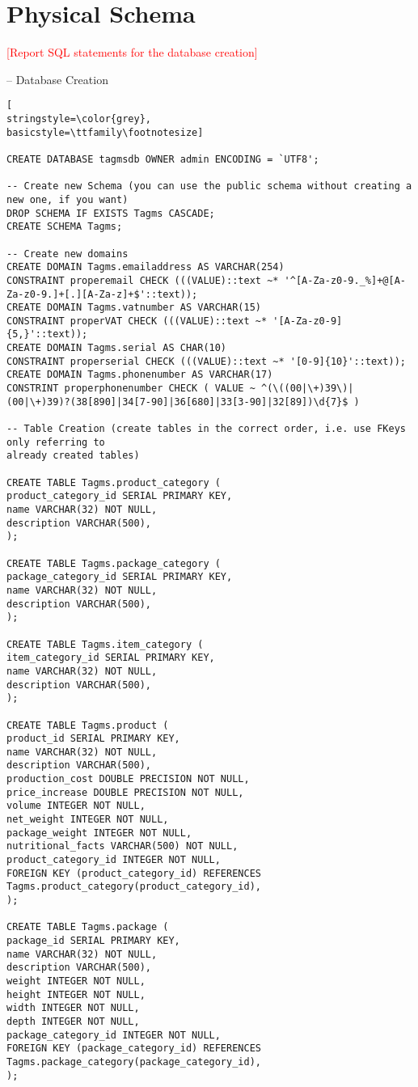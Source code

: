 \section{Physical Schema}
\textcolor{red}{[Report SQL statements for the database creation]}

-- Database Creation
\begin{lstlisting}[
stringstyle=\color{grey},
basicstyle=\ttfamily\footnotesize]

CREATE DATABASE tagmsdb OWNER admin ENCODING = `UTF8';

-- Create new Schema (you can use the public schema without creating a new one, if you want)
DROP SCHEMA IF EXISTS Tagms CASCADE;
CREATE SCHEMA Tagms;

-- Create new domains
CREATE DOMAIN Tagms.emailaddress AS VARCHAR(254)
CONSTRAINT properemail CHECK (((VALUE)::text ~* '^[A-Za-z0-9._%]+@[A-Za-z0-9.]+[.][A-Za-z]+$'::text));
CREATE DOMAIN Tagms.vatnumber AS VARCHAR(15)
CONSTRAINT properVAT CHECK (((VALUE)::text ~* '[A-Za-z0-9]{5,}'::text));
CREATE DOMAIN Tagms.serial AS CHAR(10)
CONSTRAINT properserial CHECK (((VALUE)::text ~* '[0-9]{10}'::text));
CREATE DOMAIN Tagms.phonenumber AS VARCHAR(17)
CONSTRINT properphonenumber CHECK ( VALUE ~ ^(\((00|\+)39\)|(00|\+)39)?(38[890]|34[7-90]|36[680]|33[3-90]|32[89])\d{7}$ )

-- Table Creation (create tables in the correct order, i.e. use FKeys only referring to
already created tables)

CREATE TABLE Tagms.product_category (
product_category_id SERIAL PRIMARY KEY,
name VARCHAR(32) NOT NULL,
description VARCHAR(500),
);

CREATE TABLE Tagms.package_category (
package_category_id SERIAL PRIMARY KEY,
name VARCHAR(32) NOT NULL,
description VARCHAR(500),
);

CREATE TABLE Tagms.item_category (
item_category_id SERIAL PRIMARY KEY,
name VARCHAR(32) NOT NULL,
description VARCHAR(500),
);

CREATE TABLE Tagms.product (
product_id SERIAL PRIMARY KEY,
name VARCHAR(32) NOT NULL,
description VARCHAR(500),
production_cost DOUBLE PRECISION NOT NULL,
price_increase DOUBLE PRECISION NOT NULL,
volume INTEGER NOT NULL,
net_weight INTEGER NOT NULL,
package_weight INTEGER NOT NULL,
nutritional_facts VARCHAR(500) NOT NULL,
product_category_id INTEGER NOT NULL,
FOREIGN KEY (product_category_id) REFERENCES Tagms.product_category(product_category_id),
);

CREATE TABLE Tagms.package (
package_id SERIAL PRIMARY KEY,
name VARCHAR(32) NOT NULL,
description VARCHAR(500),
weight INTEGER NOT NULL,
height INTEGER NOT NULL,
width INTEGER NOT NULL,
depth INTEGER NOT NULL,
package_category_id INTEGER NOT NULL,
FOREIGN KEY (package_category_id) REFERENCES Tagms.package_category(package_category_id),
);


\end{lstlisting}
